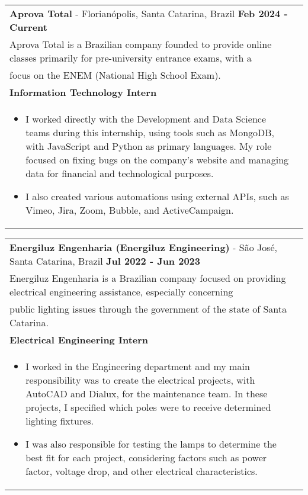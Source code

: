 \documentclass[a4paper,8pt]{article}
\begin{document}
\begin{tabularx}{\linewidth}{ @{}l r@{} }
\textbf{Aprova Total} - Florianópolis, Santa Catarina, Brazil \hfill \textbf{Feb 2024 - Current} \\[4pt]
\item Aprova Total is a Brazilian company founded to provide online classes primarily for pre-university entrance exams, with a \\ focus on the ENEM (National High School Exam). \\[4pt]
\textbf{Information Technology Intern} \\[4pt]
\begin{minipage}[t]{\linewidth}
    \begin{itemize}[nosep,after=\strut, leftmargin=1em, itemsep=2pt]
        \item I worked directly with the Development and Data Science teams during this internship, using tools such as MongoDB, with JavaScript and Python as primary languages. My role focused on fixing bugs on the company's website and managing data for financial and technological purposes.
        \item I also created various automations using external APIs, such as Vimeo, Jira, Zoom, Bubble, and ActiveCampaign.
    \end{itemize}
\end{minipage}
\end{tabularx}

\begin{tabularx}{\linewidth}{ @{}l r@{} }
\textbf{Energiluz Engenharia (Energiluz Engineering)} - São José, Santa Catarina, Brazil \hfill \textbf{Jul 2022 - Jun 2023} \\[4pt]
\item Energiluz Engenharia is a Brazilian company focused on providing electrical engineering assistance, especially concerning \\ public lighting issues through the government of the state of Santa Catarina. \\[4pt]
\textbf{Electrical Engineering Intern} \\[4pt]
\begin{minipage}[t]{\linewidth}
    \begin{itemize}[nosep,after=\strut, leftmargin=1em, itemsep=2pt]
        \item I worked in the Engineering department and my main responsibility was to create the electrical projects, with AutoCAD and Dialux, for the maintenance team. In these projects, I specified which poles were to receive determined lighting fixtures. 
        \item I was also responsible for testing the lamps to determine the best fit for each project, considering factors such as power factor, voltage drop, and other electrical characteristics.
    \end{itemize}
\end{minipage}
\end{tabularx}
\end{document}

